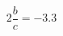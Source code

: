 \documentclass[preview]{standalone}
\begin{document}
\begin{align*}
2 \dfrac{b}{c}= -3.3
\end{align*}
\end{document}
